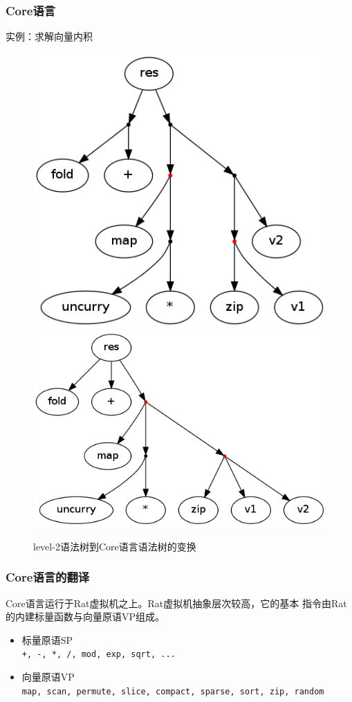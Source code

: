 \documentclass{beamer}
\begin{document}
\begin{frame}
  \frametitle{Core语言}
  \begin{block}{实例：求解向量内积}
    
  \end{block}
  \begin{figure}
    \caption{level-2语法树到Core语言语法树的变换}
    \includegraphics[scale=0.2]{images/level-2-tree.png}
    \pause
    \includegraphics[scale=0.2]{images/core-tree.png}
  \end{figure}
\end{frame}

\begin{frame}
  \frametitle{Core语言的翻译}
  Core语言运行于Rat虚拟机之上。Rat虚拟机抽象层次较高，它的基本
  指令由Rat的内建标量函数与向量原语VP组成。
  \begin{itemize}
    \item 标量原语SP\\
      \texttt{+, -, *, /, mod, exp, sqrt, ...}
    \item 向量原语VP\\
      \texttt{map, scan, permute, slice, compact, sparse, sort, zip, random}
  \end{itemize}
\end{frame}
\end{document}
